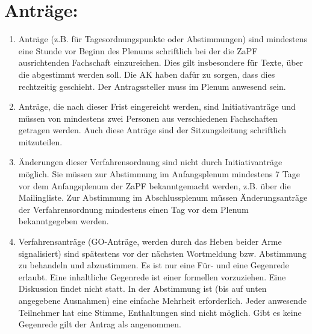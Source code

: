 \noindent
\section*{Anträge:}
\begin{enumerate}
\item{Anträge (z.B. für Tagesordnungspunkte oder Abstimmungen) sind mindestens eine Stunde vor
Beginn des Plenums schriftlich bei der die ZaPF ausrichtenden Fachschaft einzureichen. Dies gilt
insbesondere für Texte, über die abgestimmt werden soll. Die AK haben dafür zu sorgen, dass dies
rechtzeitig geschieht. Der Antragssteller muss im Plenum anwesend sein.}

\item{Anträge, die nach dieser Frist eingereicht werden, sind Initiativanträge und müssen von mindestens
zwei Personen aus verschiedenen Fachschaften getragen werden. Auch diese Anträge sind der
Sitzungsleitung schriftlich mitzuteilen.}

\item{Änderungen dieser Verfahrensordnung sind nicht durch Initiativanträge möglich. Sie müssen zur
Abstimmung im Anfangsplenum mindestens 7 Tage vor dem Anfangsplenum der ZaPF
bekanntgemacht werden, z.B. über die Mailingliste. Zur Abstimmung im Abschlussplenum müssen
Änderungsanträge der Verfahrensordnung mindestens einen Tag vor dem Plenum bekanntgegeben
werden.}

\item{Verfahrensanträge (GO-Anträge, werden durch das Heben beider Arme signalisiert) sind spätestens
vor der nächsten Wortmeldung bzw. Abstimmung zu behandeln und abzustimmen. Es ist nur eine
Für- und eine Gegenrede erlaubt. Eine inhaltliche Gegenrede ist einer formellen vorzuziehen. Eine
Diskussion findet nicht statt. In der Abstimmung ist (bis auf unten angegebene Ausnahmen) eine
einfache Mehrheit erforderlich. Jeder anwesende Teilnehmer hat eine Stimme, Enthaltungen sind
nicht möglich. Gibt es keine Gegenrede gilt der Antrag als angenommen.}



\end{enumerate}
